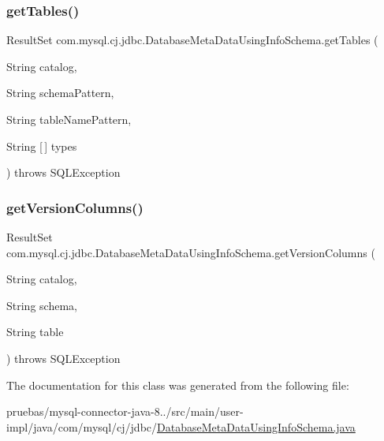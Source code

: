 \subsubsection{\texorpdfstring{get\+Tables()}{getTables()}}
{\footnotesize\ttfamily Result\+Set com.\+mysql.\+cj.\+jdbc.\+Database\+Meta\+Data\+Using\+Info\+Schema.\+get\+Tables (\begin{DoxyParamCaption}\item[{String}]{catalog,  }\item[{String}]{schema\+Pattern,  }\item[{String}]{table\+Name\+Pattern,  }\item[{String \mbox{[}$\,$\mbox{]}}]{types }\end{DoxyParamCaption}) throws S\+Q\+L\+Exception}

\mbox{\label{classcom_1_1mysql_1_1cj_1_1jdbc_1_1_database_meta_data_using_info_schema_aa112f9dc4025c1dd6b4c0ec2b85f7ede}} 
\subsubsection{\texorpdfstring{get\+Version\+Columns()}{getVersionColumns()}}
{\footnotesize\ttfamily Result\+Set com.\+mysql.\+cj.\+jdbc.\+Database\+Meta\+Data\+Using\+Info\+Schema.\+get\+Version\+Columns (\begin{DoxyParamCaption}\item[{String}]{catalog,  }\item[{String}]{schema,  }\item[{String}]{table }\end{DoxyParamCaption}) throws S\+Q\+L\+Exception}



The documentation for this class was generated from the following file\+:\begin{DoxyCompactItemize}
\item 
pruebas/mysql-\/connector-\/java-\/8../src/main/user-\/impl/java/com/mysql/cj/jdbc/\mbox{\hyperlink{_database_meta_data_using_info_schema_8java}{Database\+Meta\+Data\+Using\+Info\+Schema.\+java}}\end{DoxyCompactItemize}
